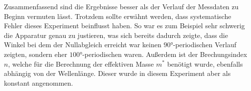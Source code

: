 Zusammenfassend sind die Ergebnisse besser als der Verlauf der Messdaten zu Beginn vermuten lässt. Trotzdem sollte erwähnt werden, dass systematische Fehler dieses Experiment beinflusst haben. So war es zum Beispiel sehr schwerig die Apparatur genau zu justieren, was sich bereits dadurch zeigte, dass die Winkel bei dem der
Nullabgleich erreicht war keinen $90°$-periodischen Verlauf zeigten, sondern eher $100°$-periodischen waren. Außerdem ist der Brechungsindex $n$, welche für die Berechnung der effektiven Masse $m^{*}$ benötigt wurde, ebenfalls abhängig von der Wellenlänge. Dieser wurde in diesem Experiment aber als konstant angenommen.


